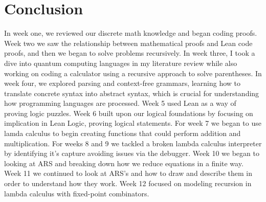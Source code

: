 \documentclass{article}
\begin{document}
\section*{Conclusion}
In week one, we reviewed our discrete math knowledge and began coding proofs. Week two we saw the relationship between mathematical proofs and Lean code proofs, and then we began to solve problems recursively. In week three, I took a dive into quantum computing languages in my literature review while also working on coding a calculator using a recursive approach to solve parentheses. In week four, we explored parsing and context-free grammars, learning how to translate concrete syntax into abstract syntax, which is crucial for understanding how programming languages are processed. Week 5 used Lean as a way of proving logic puzzles. Week 6 built upon our logical foundations by focusing on implication in Lean Logic, proving logical statements. For week 7 we began to use lamda calculus to begin creating functions that could perform addition and multiplication. For weeks 8 and 9 we tackled a broken lambda calculus interpreter by identifying it's capture avoiding issues via the debugger. Week 10 we began to looking at ARS and breaking down how we reduce equations in a finite way. Week 11 we continued to look at ARS's and how to draw and describe them in order to understand how they work. Week 12 focused on modeling recursion in lambda calculus with fixed-point combinators.
\end{document}
